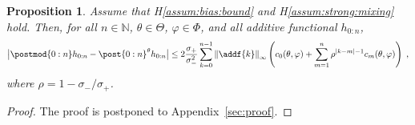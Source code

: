 \documentclass{article}
\newtheorem{proposition}[theorem]{Proposition}
\newcommand{\udlow}{\sigma_-}
\newcommand{\udup}{\sigma_+}
\newcommand{\nset}{\mathbb{N}}
\newcommand{\1}{\mathbbm{1}}
\newcommand{\parvec}{\theta}
\newcommand{\eqsp}{\;}
\begin{document}
\begin{proposition}
\label{prop:bias}
Assume that H\ref{assum:bias:bound} and H\ref{assum:strong:mixing} hold. Then, for all $n \in \nset$, $\parvec\in\Theta$, $\varphi\in\Phi$, and all additive functional $h_{0:n}$,  
$$
        \big| \postmod{0:n} h_{0:n} -  \post{0:n}^{\parvec} h_{0:n} \big| 
        \leq 2\frac{\sigma_+}{\sigma_-^2}\sum_{k=0}^{n-1}\left\| \addf{k}\right\|_\infty\left( c_0(\theta,\varphi) + \sum_{m=1}^n \rho^{|k-m|-1}c_m(\theta,\varphi)\right)\eqsp,%
$$
where $\rho = 1-\sigma_-/\sigma_+$.
\end{proposition}

\begin{proof}
The proof is postponed to Appendix~\ref{sec:proof}.
\end{proof}
\end{document}

